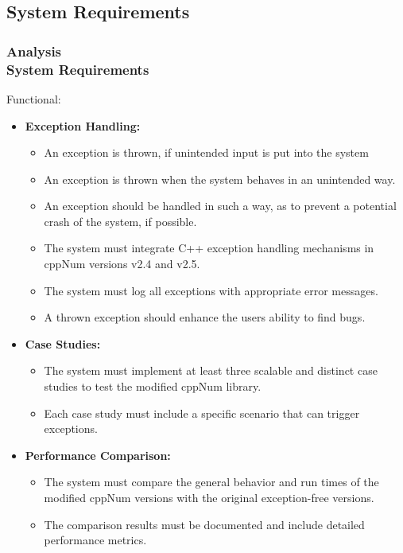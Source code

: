 \documentclass[ucs,10pt]{beamer}
\begin{document}
\subsection{System Requirements}

\begin{frame}
\frametitle{Analysis \\
	\small \color{rwth-blue} System Requirements}
	Functional:
	\begin{itemize}
		\item \textbf{Exception Handling:}
		\begin{itemize}
			\item An exception is thrown, if unintended input is put into the system
			\item An exception is thrown when the system behaves in an unintended way. 
                \item An exception should be handled in such a way, as to prevent a potential crash of the system, if possible.
			\item The system must integrate C++ exception handling mechanisms in cppNum versions v2.4 and v2.5.
			\item The system must log all exceptions with appropriate error messages.
                \item A thrown exception should enhance the users ability to find bugs.
		\end{itemize}
		\item \textbf{Case Studies:}
		\begin{itemize}
			\item The system must implement at least three scalable and distinct case studies to test the modified cppNum library.
			\item Each case study must include a specific scenario that can trigger exceptions.
		\end{itemize}
		\item \textbf{Performance Comparison:}
		\begin{itemize}
			\item The system must compare the general behavior and run times of the modified cppNum versions with the original exception-free versions.
			\item The comparison results must be documented and include detailed performance metrics.
		\end{itemize}
	\end{itemize}
\end{frame}
\end{document}
